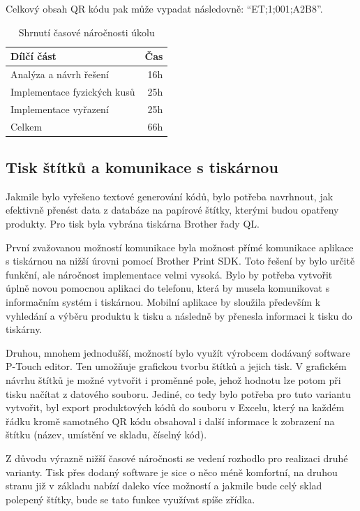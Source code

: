 Celkový obsah QR kódu pak může vypadat následovně: \enquote{ET;1;001;A2B8}.


\begin{table}
	\centering
	\caption[Časová náročnost úkolu na evidenci fyzických kusů na skladě]{Shrnutí časové náročnosti úkolu}
	\label{tab:TopLevelTableLabel}
		\begin{tabular}{lr}
			\toprule
			Dílčí část & Čas\\
			\midrule
			Analýza a návrh řešení & 16h \\
			Implementace fyzických kusů & 25h \\
            Implementace vyřazení & 25h \\
            \midrule
            Celkem  & 66h \\
			\midrule
		\end{tabular}
\end{table}

\subsection{Tisk štítků a komunikace s tiskárnou}

Jakmile bylo vyřešeno textové generování kódů, bylo potřeba navrhnout, jak efektivně přenést data z databáze na papírové štítky, kterými budou opatřeny produkty. Pro tisk byla vybrána tiskárna Brother řady QL. 

První zvažovanou možností komunikace byla možnost přímé komunikace aplikace s tiskárnou na nižší úrovni pomocí Brother Print SDK. \cite{brotherInformationLabel} Toto řešení by bylo určitě funkční, ale náročnost implementace velmi vysoká. Bylo by potřeba vytvořit úplně novou pomocnou aplikaci do telefonu, která by musela komunikovat s informačním systém i tiskárnou. Mobilní aplikace by sloužila především k vyhledání a výběru produktu k tisku a následně by přenesla informaci k tisku do tiskárny.

Druhou, mnohem jednodušší, možností bylo využít výrobcem dodávaný software P-Touch editor. Ten umožňuje grafickou tvorbu štítků a jejich tisk. V grafickém návrhu štítků je možné vytvořit i proměnné pole, jehož hodnotu lze potom při tisku načítat z datového souboru.
Jediné, co tedy bylo potřeba pro tuto variantu vytvořit, byl export produktových kódů do souboru v Excelu, který na každém řádku kromě samotného QR kódu obsahoval i další informace k zobrazení na štítku (název, umístění ve skladu, číselný kód).

Z důvodu výrazně nižší časové náročnosti se vedení rozhodlo pro realizaci druhé varianty. Tisk přes dodaný software je sice o něco méně komfortní, na druhou stranu již v základu nabízí daleko více možností a jakmile bude celý sklad polepený štítky, bude se tato funkce využívat spíše zřídka. 

